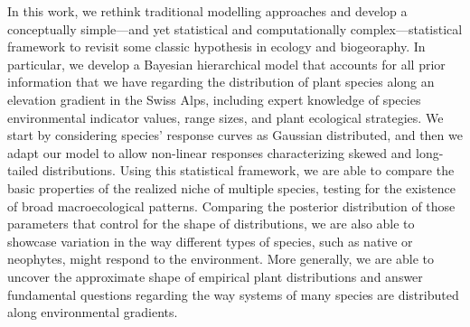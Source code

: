 \documentclass[11pt, a4paper]{article}
\begin{document}
In this work, we rethink traditional modelling approaches and develop a conceptually simple---and yet statistical and computationally complex---statistical framework to revisit some classic hypothesis in ecology and biogeoraphy. In particular, we develop a Bayesian hierarchical model that accounts for all prior information that we have regarding the distribution of plant species along an elevation gradient in the Swiss Alps, including expert knowledge of species environmental indicator values, range sizes, and plant ecological strategies. We start by considering species' response curves as Gaussian distributed, and then we adapt our model to allow non-linear responses characterizing skewed and long-tailed distributions. Using this statistical framework, we are able to compare the basic properties of the realized niche of multiple species, testing for the existence of broad macroecological patterns. Comparing the posterior distribution of those parameters that control for the shape of distributions, we are also able to showcase variation in the way different types of species, such as native or neophytes, might respond to the environment. More generally, we are able to uncover the approximate shape of empirical plant distributions and answer fundamental questions regarding the way systems of many species are distributed along environmental gradients.


\end{document}

